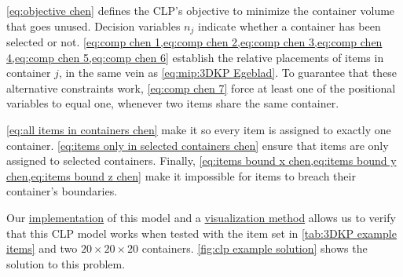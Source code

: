 \cref{eq:objective chen} defines the CLP's objective to minimize the container volume that goes unused. Decision variables $n_j$ indicate whether a container has been selected or not. \cref{eq:comp chen 1,eq:comp chen 2,eq:comp chen 3,eq:comp chen 4,eq:comp chen 5,eq:comp chen 6} establish the relative placements of items in container $j$, in the same vein as \cref{eq:mip:3DKP Egeblad}. To guarantee that these alternative constraints work, \cref{eq:comp chen 7} force at least one of the positional variables to equal one, whenever two items share the same container.

\cref{eq:all items in containers chen} make it so every item is assigned to exactly one container. \cref{eq:items only in selected containers chen} ensure that items are only assigned to selected containers. Finally, \cref{eq:items bound x chen,eq:items bound y chen,eq:items bound z chen} make it impossible for items to breach their container's boundaries.

Our \href{https://github.com/phcentenaro7/IC-Knapsack/blob/7f581ff02334992a6181a06adbce668b528caeba/Knapsack/Chen/clp.jl#L27}{implementation} of this model and a \href{https://github.com/phcentenaro7/IC-Knapsack/blob/7f581ff02334992a6181a06adbce668b528caeba/Knapsack/Chen/clp.jl#L122}{visualization method} allows us to verify that this CLP model works when tested with the item set in \cref{tab:3DKP example items} and two $20\times20\times20$ containers. \cref{fig:clp example solution} shows the solution to this problem.

